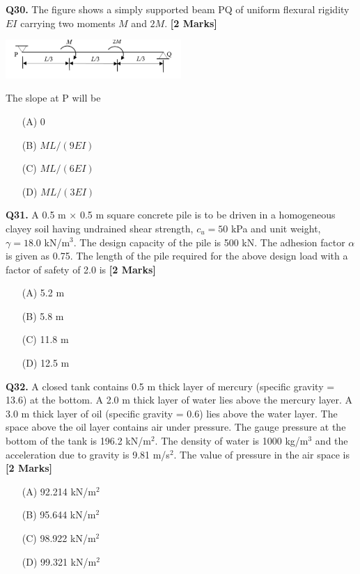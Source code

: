 \documentclass[11pt]{article}
\newcommand{\questionb}[2]{
    \noindent\textbf{Q#2.} #1 \hfill \textbf{[2 Marks]}
}
\begin{document}
\questionb{The figure shows a simply supported beam PQ of uniform flexural rigidity \( EI \) carrying two moments \( M \) and \( 2M \).}{30}
\begin{center}
\includegraphics[width=0.5\textwidth]{figures/q30}
\end{center}
The slope at P will be
\begin{enumerate}
    \item[(A)] 0
    \item[(B)] \( ML/(9EI) \)
    \item[(C)] \( ML/(6EI) \)
    \item[(D)] \( ML/(3EI) \)
\end{enumerate}
\vspace{0.5cm}

\questionb{A 0.5 m × 0.5 m square concrete pile is to be driven in a homogeneous clayey soil having undrained shear strength, \( c_u = 50 \) kPa and unit weight, \( \gamma = 18.0 \) kN/m\(^3\). The design capacity of the pile is 500 kN. The adhesion factor \( \alpha \) is given as 0.75. The length of the pile required for the above design load with a factor of safety of 2.0 is}{31}
\begin{enumerate}
    \item[(A)] 5.2 m
    \item[(B)] 5.8 m
    \item[(C)] 11.8 m
    \item[(D)] 12.5 m
\end{enumerate}
\vspace{0.5cm}

\questionb{A closed tank contains 0.5 m thick layer of mercury (specific gravity = 13.6) at the bottom. A 2.0 m thick layer of water lies above the mercury layer. A 3.0 m thick layer of oil (specific gravity = 0.6) lies above the water layer. The space above the oil layer contains air under pressure. The gauge pressure at the bottom of the tank is 196.2 kN/m\(^2\). The density of water is 1000 kg/m\(^3\) and the acceleration due to gravity is 9.81 m/s\(^2\). The value of pressure in the air space is}{32}
\begin{enumerate}
    \item[(A)] 92.214 kN/m\(^2\)
    \item[(B)] 95.644 kN/m\(^2\)
    \item[(C)] 98.922 kN/m\(^2\)
    \item[(D)] 99.321 kN/m\(^2\)
\end{enumerate}
\vspace{0.5cm}
\end{document}
